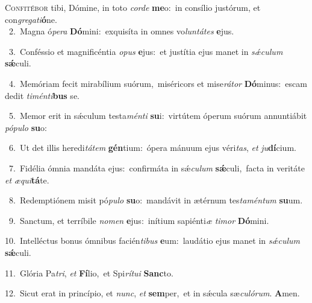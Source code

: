 \lettrine{\initial\textcolor{\initialcolor}{C}}{onfitébor} tibi, Dómine, in toto \textit{cor}\-\textit{de} \textbf{me}\-o:~\star in consílio justórum, et con\-\textit{gre}\-\textit{ga}\textit{ti}\textbf{ó}ne.\\
{\numbfont\textcolor{\numbcolor}{~2.}}~Magna ó\-\textit{pe}\-\textit{ra} \textbf{Dó}\-mini:~\star exquisíta in omnes vo\-\textit{lun}\-\textit{tá}\textit{tes} \textbf{e}\-jus.\par
{\numbfont\textcolor{\numbcolor}{~3.}}~Conféssio et magnificéntia \textit{o}\-\textit{pus} \textbf{e}\-jus:~\star et justítia ejus manet in \textit{sǽ}\-\textit{cu}\textit{lum} \textbf{sǽ}\-culi.\par
{\numbfont\textcolor{\numbcolor}{~4.}}~Memóriam fecit mirabílium suórum,~\dagger miséricors et mise\-\textit{rá}\-\textit{tor} \textbf{Dó}\-minus:~\star escam dedit \textit{ti}\-\textit{mén}\textit{ti}\textbf{bus} se.\par
{\numbfont\textcolor{\numbcolor}{~5.}}~Memor erit in sǽculum testa\-\textit{mén}\-\textit{ti} \textbf{su}\-i:~\star virtútem óperum suórum annuntiábit \textit{pó}\-\textit{pu}\textit{lo} \textbf{su}\-o:\par
{\numbfont\textcolor{\numbcolor}{~6.}}~Ut det illis heredi\-\textit{tá}\-\textit{tem} \textbf{gén}\-tium:~\star ópera mánuum ejus véri\-\textit{tas}\-, \textit{et} \textit{ju}\-\textbf{dí}cium.\par
{\numbfont\textcolor{\numbcolor}{~7.}}~Fidélia ómnia mandáta ejus:~\dagger confirmáta in sǽ\-\textit{cu}\-\textit{lum} \textbf{sǽ}\-culi,~\star facta in veritáte \textit{et} \textit{æ}\-\textit{qui}\textbf{tá}te.\par
{\numbfont\textcolor{\numbcolor}{~8.}}~Redemptiónem misit pó\-\textit{pu}\-\textit{lo} \textbf{su}\-o:~\star mandávit in ætérnum tes\-\textit{ta}\-\textit{mén}\textit{tum} \textbf{su}\-um.\par
{\numbfont\textcolor{\numbcolor}{~9.}}~Sanctum, et terríbile \textit{no}\-\textit{men} \textbf{e}\-jus:~\star inítium sapiénti\textit{æ} \textit{ti}\-\textit{mor} \textbf{Dó}\-mini.\par
{\numbfont\textcolor{\numbcolor}{10.}}~Intelléctus bonus ómnibus facién\-\textit{ti}\-\textit{bus} \textbf{e}\-um:~\star laudátio ejus manet in \textit{sǽ}\-\textit{cu}\textit{lum} \textbf{sǽ}\-culi.\par
{\numbfont\textcolor{\numbcolor}{11.}}~Glória Pa\-\textit{tri}\-, \textit{et} \textbf{Fí}\-lio,~\star et Spi\-\textit{rí}\-\textit{tu}\textit{i} \textbf{Sanc}\-to.\par
{\numbfont\textcolor{\numbcolor}{12.}}~Sicut erat in princípio, et \textit{nunc}\-, \textit{et} \textbf{sem}\-per,~\star et in sǽcula sæ\-\textit{cu}\-\textit{ló}\textit{rum}. \textbf{A}\-men.\par

